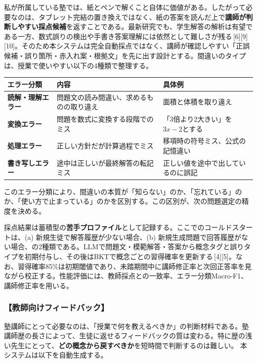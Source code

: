 \documentclass[paper=a4,fontsize=10.5bp,jafontsize=10.5bp,twocolumn]{jlreq}
\begin{document}
私が所属している塾では、紙とペンで解くこと自体に価値がある。したがって必要なのは、タブレット完結の置き換えではなく、紙の答案を読んだ上で\textbf{講師が判断しやすい採点候補}を返すことである。最新研究でも、学生解答の解析は有望である一方、数式誤りの検出や手書き答案理解には依然として難しさが残る\,[6][9][10]。そのため本システムは完全自動採点ではなく、講師が確認しやすい「正誤候補・誤り箇所・赤入れ案・根拠文」を先に出す設計とする。間違いのタイプは、授業で使いやすい以下の4種類で整理する。

\begin{scriptsize}\noindent
\begin{tabularx}{\linewidth}{>{\bfseries}l X X}
\toprule
エラー分類 & 内容 & 具体例 \\
\midrule
読解・理解エラー & 問題文の読み間違い、求めるものの取り違え & 面積と体積を取り違え \\
変換エラー & 問題を数式に変換する段階でのミス & 「3倍より2大きい」を$3x-2$とする \\
処理エラー & 正しい方針だが計算過程でミス & 移項時の符号ミス、公式の記憶違い \\
書き写しエラー & 途中は正しいが最終解答の転記ミス & 正しい値を途中で出しているのに誤記 \\
\bottomrule
\end{tabularx}
\end{scriptsize}

このエラー分類により、間違いの本質が「知らない」のか、「忘れている」のか、「使い方で止まっている」のかを区別する。この区別が、次の問題選定の精度を決める。

採点結果は蓄積型の\textbf{苦手プロファイル}として記録する。ここでのコールドスタートは、(a) 新規生徒で解答履歴が少ない場合、(b) 新規生成問題で回答履歴がない場合、の2種類である。LLMで問題文・模範解答・答案から概念タグと誤りタイプを初期付与し、その後はBKTで概念ごとの習得確率を更新する\,[4][5]。なお、習得確率85\%は初期閾値であり、未踏期間中に講師修正率と次回正答率を見ながら校正する。性能評価には、教師採点との一致率、エラー分類Macro-F1、講師修正率を用いる。

\subsubsection{【教師向けフィードバック】}

塾講師にとって必要なのは、「授業で何を教えるべきか」の判断材料である。塾講師歴の長さによって、生徒に返せるフィードバックの質は変わる。特に歴の浅い先生にとって、\textbf{どの概念から戻すべきか}を短時間で判断するのは難しい。
本システムは以下を自動生成する。
\end{document}

